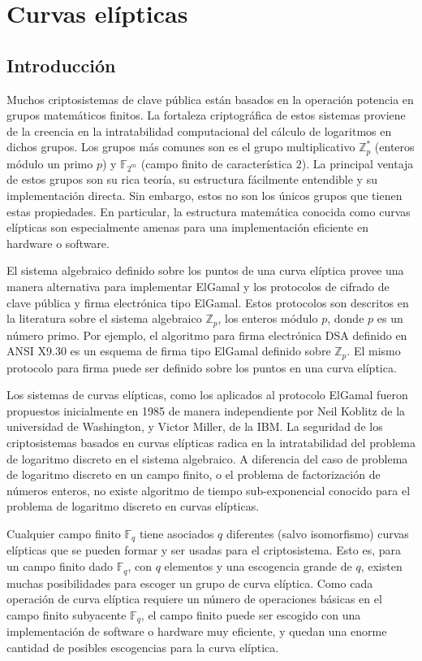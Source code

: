 \documentclass[12pt,oneside]{book}
\begin{document}
\chapter{Curvas el\'ipticas}

\section{Introducci\'on}

Muchos criptosistemas de clave p\'ublica est\'an basados en la operaci\'on potencia en grupos matem\'aticos finitos. La fortaleza criptogr\'afica de estos sistemas proviene de la creencia en la intratabilidad computacional del c\'alculo de logaritmos en dichos grupos. Los grupos m\'as comunes son es el grupo multiplicativo $\mathbb{Z}_p^{\ast}$ (enteros m\'odulo un primo $p$) y $\mathbb{F}_{2^m}$ (campo finito de caracter\'istica 2). La principal ventaja de estos grupos son su rica teor\'ia, su estructura f\'acilmente entendible y su implementaci\'on directa. Sin embargo, estos no son los \'unicos grupos que tienen estas propiedades. En particular, la estructura matem\'atica conocida como curvas el\'ipticas son especialmente amenas para una implementaci\'on eficiente en hardware o software.

El sistema algebraico definido sobre los puntos de una curva el\'iptica provee una manera alternativa para implementar ElGamal y los protocolos de cifrado de clave p\'ublica y firma electr\'onica tipo ElGamal. Estos protocolos son descritos en la literatura sobre el sistema algebraico $\mathbb{Z}_p$, los enteros m\'odulo $p$, donde $p$ es un n\'umero primo. Por ejemplo, el algoritmo para firma electr\'onica DSA definido en ANSI X9.30 es un esquema de firma tipo ElGamal definido sobre $\mathbb{Z}_p$. El mismo protocolo para firma puede ser definido sobre los puntos en una curva el\'iptica. 

Los sistemas de curvas el\'ipticas, como los aplicados al protocolo ElGamal fueron propuestos inicialmente en 1985 de manera independiente por Neil Koblitz de la universidad de Washington, y Victor Miller, de la IBM. La seguridad de los criptosistemas basados en curvas el\'ipticas radica en la intratabilidad del problema de logaritmo discreto en el sistema algebraico. A diferencia del caso de problema de logaritmo discreto en un campo finito, o el problema de factorizaci\'on de n\'umeros enteros, no existe algoritmo de tiempo sub-exponencial conocido para el problema de logaritmo discreto en curvas el\'ipticas. 

Cualquier campo finito $\mathbb{F}_q$ tiene asociados $q$ diferentes (salvo isomorfismo) curvas el\'ipticas que se pueden formar y ser usadas para el criptosistema. Esto es, para un campo finito dado $\mathbb{F}_q$, con $q$ elementos y una escogencia grande de $q$, existen muchas posibilidades para escoger un grupo de curva el\'iptica. Como cada operaci\'on de curva el\'iptica requiere un n\'umero de operaciones b\'asicas en el campo finito subyacente  $\mathbb{F}_q$, el campo finito puede ser escogido con una implementaci\'on de  software o hardware muy eficiente, y quedan una enorme cantidad de posibles escogencias para la curva el\'iptica.
\end{document}
